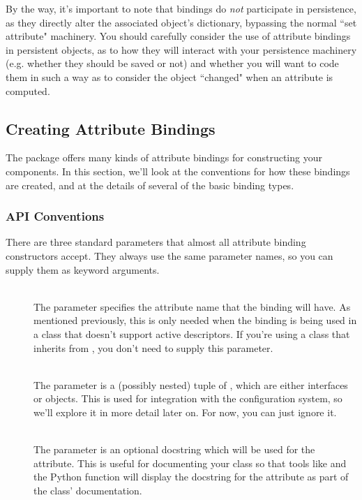 \begin{verbatim%
}
\begin{verbatim%
}
\begin{verbatim%
}
\begin{verbatim%
}
\begin{verbatim%
}
\begin{verbatim%
}
\begin{verbatim%
}
\begin{verbatim%
}
\begin{verbatim%
}
By the way, it's important to note that bindings do \emph{not} participate in
persistence, as they directly alter the associated object's dictionary,
bypassing the normal ``set attribute" machinery.  You should carefully
consider the use of attribute bindings in persistent objects, as to how they
will interact with your persistence machinery (e.g. whether they should be
saved or not) and whether you will want to code them in such a way as to
consider the object ``changed" when an attribute is computed.




\subsection{Creating Attribute Bindings}

The  package offers many kinds of attribute bindings for
constructing your components.  In this section, we'll look at the conventions
for how these bindings are created, and at the details of several of the basic
binding types.

\subsubsection{API Conventions}

There are three standard parameters that almost all attribute binding
constructors accept.  They always use the same parameter names, so you can
supply them as keyword arguments.

\begin{description}

\item[] \hfill \\
The  parameter specifies the attribute name that the binding will
have.  As mentioned previously, this is only needed when the binding is being
used in a class that doesn't support active descriptors.  If you're using
a class that inherits from , you don't need to supply this
parameter.

\item[] \hfill \\
The  parameter is a (possibly nested) tuple of
, which are either interfaces or 
objects.  This is used for integration with the configuration system, so we'll 
explore it in more detail later on.  For now, you can just ignore it.

\item[] \hfill \\
The  parameter is an optional docstring which will be used for the
attribute.  This is useful for documenting your class so that tools like
 and the Python  function will display the
docstring for the attribute as part of the class' documentation.


\end{description}
\end{verbatim%
}
\end{verbatim%
}
\end{verbatim%
}
\end{verbatim%
}
\end{verbatim%
}
\end{verbatim%
}
\end{verbatim%
}
\end{verbatim%
}
\end{verbatim%
}
